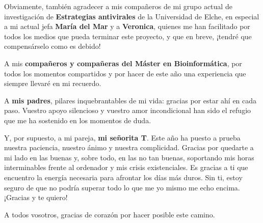 \documentclass[10pt,a4paper]{article}
\begin{document}
Obviamente, también agradecer a mis compañeros de mi grupo actual de investigación de \textbf{Estrategias antivirales} de la Universidad de Elche, en especial a mi actual jefa \textbf{María del Mar} y a \textbf{Veronica}, quienes me han facilitado por todos los medios que pueda terminar este proyecto, y que en breve, ¡tendré que compensárselo como es debido!

A mis \textbf{compañeros y compañeras del Máster en Bioinformática}, por todos los momentos compartidos y por hacer de este año una experiencia que siempre llevaré en mi recuerdo.

A \textbf{mis padres}, pilares inquebrantables de mi vida: gracias por estar ahí en cada paso. Vuestro apoyo silencioso y vuestro amor incondicional han sido el refugio que me ha sostenido en los momentos de duda.

Y, por supuesto, a mi pareja, \textbf{mi señorita T}. Este año ha puesto a prueba nuestra paciencia, nuestro ánimo y nuestra complicidad. Gracias por quedarte a mi lado en las buenas y, sobre todo, en las no tan buenas, soportando mis horas interminables frente al ordenador y mis crisis existenciales. Es gracias a ti que encuentro la energía necesaria para afrontar los días más duros. Sin ti, estoy seguro de que no podría superar todo lo que me yo mismo me echo encima. ¡Gracias y te quiero!

A todos vosotros, gracias de corazón por hacer posible este camino.


\newpage
\tableofcontents        %
\clearpage              %


\end{document}
